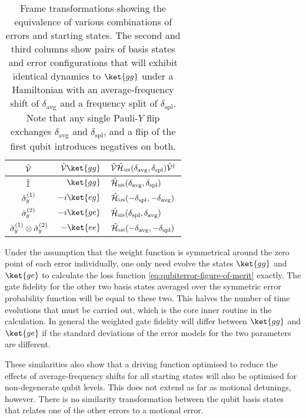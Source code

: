 \begin{table}%
    \renewcommand*\arraystretch{1.2}%
    \begin{tabular*}{\figwidth}{@{\extracolsep{\fill}} crl @{}}\toprule
    $\hat{\mathcal V}$ & $\op{\mathcal V}\ket{gg}$ & $\hat{\mathcal V}\hat{\mathcal H}_{\textsc{ms}}(\delta_{\text{avg}}, \delta_{\text{spl}})\hat{\mathcal V}^\dagger$\\\midrule 
    $\hat{\mathbb I}$ & $\ket{gg}$ & $\hat{\mathcal H}_{\textsc{ms}}(\delta_{\text{avg}}, \delta_{\text{spl}})$\\
    $\hat{\sigma}_{\mkern-1mu y}^{(1)}$ & $-i\ket{eg}$ & $\hat{\mathcal H}_{\textsc{ms}}(-\delta_{\text{spl}}, -\delta_{\text{avg}})$\\
    $\hat{\sigma}_{\mkern-1mu y}^{(2)}$ & $-i\ket{ge}$ & $\hat{\mathcal H}_{\textsc{ms}}(\delta_{\text{spl}}, \delta_{\text{avg}})$\\
    $\hat{\sigma}_{\mkern-1mu y}^{(1)}\otimes\hat{\sigma}_{\mkern-1mu y}^{(2)}$ & $-\ket{ee}$ & $\hat{\mathcal H}_{\textsc{ms}}(-\delta_{\text{avg}}, -\delta_{\text{spl}})$\\
    \bottomrule\end{tabular*}%
    \caption[Error equivalence rules by frame transformations]{\label{tab:qubiterror-error-frames}%
        Frame transformations showing the equivalence of various combinations of errors and starting states.
        The second and third columns show pairs of basis states and error configurations that will exhibit identical dynamics to $\ket{gg}$ under a Hamiltonian with an average-frequency shift of $\delta_{\text{avg}}$ and a frequency split of $\delta_{\text{spl}}$.
        Note that any single Pauli-$Y$ flip exchanges $\delta_{\text{avg}}$ and $\delta_{\text{spl}}$, and a flip of the first qubit introduces negatives on both.
    }%
\end{table}

Under the assumption that the weight function is symmetrical around the zero point of each error individually, one only need evolve the states $\ket{gg}$ and $\ket{ge}$ to calculate the loss function \cref{eq:qubiterror-figure-of-merit} exactly.
The gate fidelity for the other two basis states averaged over the symmetric error probability function will be equal to these two.
This halves the number of time evolutions that must be carried out, which is the core inner routine in the calculation.
In general the weighted gate fidelity will differ between $\ket{gg}$ and $\ket{ge}$ if the standard deviations of the error models for the two parameters are different.

These similarities also show that a driving function optimised to reduce the effects of average-frequency shifts for all starting states will also be optimised for non-degenerate qubit levels.
This does not extend as far as motional detunings, however.
There is no similarity transformation between the qubit basis states that relates one of the other errors to a motional error.




